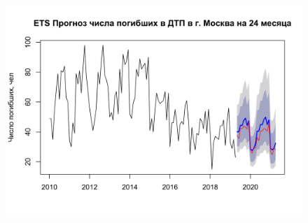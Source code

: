 \documentclass[14pt, a4paper]{extarticle}\usepackage[]{graphicx}\usepackage[]{color}
\makeatletter
\def\maxwidth{ %
  \ifdim\Gin@nat@width>\linewidth
    \linewidth
  \else
    \Gin@nat@width
  \fi
}
\newenvironment{knitrout}{}{} %
\makeatother
\begin{document}
\begin{figure}[H]
\begin{knitrout}
\color{fgcolor}

{\centering \includegraphics[width=\maxwidth]{figure/unnamed-chunk-32-1} 

}



\end{knitrout}
\end{figure}
\end{document}
